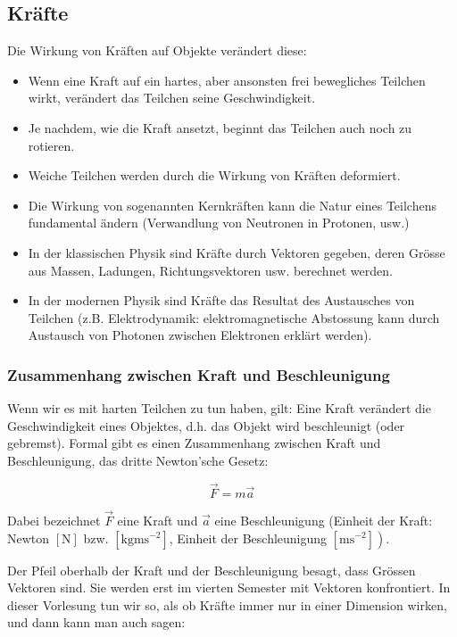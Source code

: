 \subsection{Kräfte}

Die Wirkung von Kräften auf Objekte verändert diese:

\begin{itemize}
  \item Wenn eine Kraft auf ein hartes, aber ansonsten frei bewegliches Teilchen wirkt, verändert das Teilchen seine Geschwindigkeit.
  \item Je nachdem, wie die Kraft ansetzt, beginnt das Teilchen auch noch zu rotieren.
  \item Weiche Teilchen werden durch die Wirkung von Kräften deformiert.
  \item Die Wirkung von sogenannten Kernkräften kann die Natur eines Teilchens fundamental ändern (Verwandlung von Neutronen in Protonen, usw.)
  \item In der klassischen Physik sind Kräfte durch Vektoren gegeben, deren Grösse aus Massen, Ladungen, Richtungsvektoren usw. berechnet werden.
  \item In der modernen Physik sind Kräfte das Resultat des Austausches von Teilchen (z.B. Elektrodynamik: elektromagnetische Abstossung kann durch Austausch von Photonen zwischen Elektronen erklärt werden).
\end{itemize}

\subsubsection*{Zusammenhang zwischen Kraft und Beschleunigung}
Wenn wir es mit harten Teilchen zu tun haben, gilt: Eine Kraft verändert die Geschwindigkeit eines Objektes, d.h. das Objekt wird beschleunigt (oder gebremst). Formal gibt es einen Zusammenhang zwischen Kraft und Beschleunigung, das dritte Newton'sche Gesetz:

$$
\vec{F}=m \vec{a}
$$

Dabei bezeichnet $\vec{F}$ eine Kraft und $\vec{a}$ eine Beschleunigung (Einheit der Kraft: Newton $[\mathrm{N}]$ bzw. $\left[\mathrm{kg} \mathrm{m} \mathrm{s}^{-2}\right]$, Einheit der Beschleunigung $\left.\left[\mathrm{m} \mathrm{s}^{-2}\right]\right)$.

Der Pfeil oberhalb der Kraft und der Beschleunigung besagt, dass Grössen Vektoren sind. Sie werden erst im vierten Semester mit Vektoren konfrontiert. In dieser Vorlesung tun wir so, als ob Kräfte immer nur in einer Dimension wirken, und dann kann man auch sagen:

